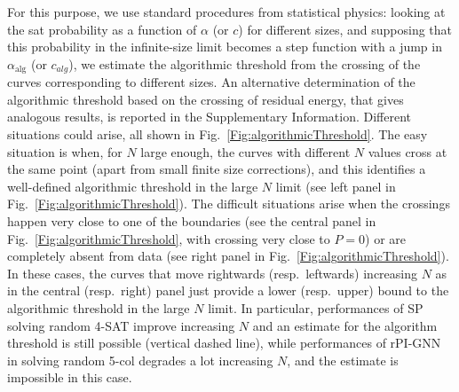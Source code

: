 \documentclass{article}
\begin{document}
For this purpose, we use standard procedures from statistical physics: looking at the sat probability as a function of $\alpha$ (or $c$) for different sizes, and supposing that this probability in the infinite-size limit becomes a step function with a jump in $\alpha_\text{alg}$ (or $c_{alg}$), we estimate the algorithmic threshold from the crossing of the curves corresponding to different sizes. An alternative determination of the algorithmic threshold based on the crossing of residual energy, that gives analogous results, is reported in the Supplementary Information. Different situations could arise, all shown in Fig.~\ref{Fig:algorithmicThreshold}.
The easy situation is when, for $N$ large enough, the curves with different $N$ values cross at the same point (apart from small finite size corrections), and this identifies a well-defined algorithmic threshold in the large $N$ limit (see left panel in Fig.~\ref{Fig:algorithmicThreshold}).
The difficult situations arise when the crossings happen very close to one of the boundaries (see the central panel in Fig.~\ref{Fig:algorithmicThreshold}, with crossing very close to $P=0$) or are completely absent from data (see right panel in Fig.~\ref{Fig:algorithmicThreshold}). In these cases, the curves that move rightwards (resp.~leftwards) increasing $N$ as in the central (resp.~right) panel just provide a lower (resp.~upper) bound to the algorithmic threshold in the large $N$ limit.
In particular, performances of SP solving random 4-SAT improve increasing $N$ and an estimate for the algorithm threshold is still possible (vertical dashed line), while performances of rPI-GNN in solving random 5-col degrades a lot increasing $N$, and the estimate is impossible in this case.
\end{document}
